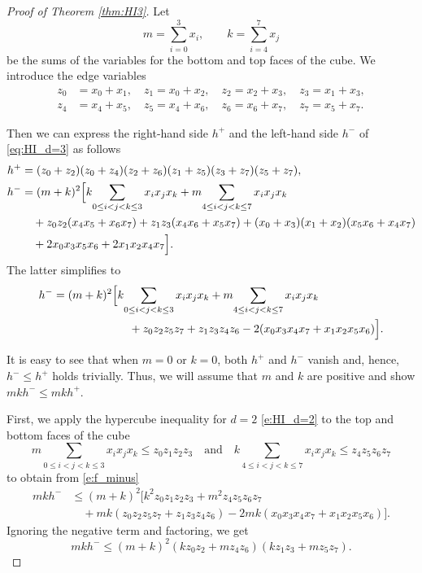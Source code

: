 \documentclass[11pt]{amsart}
\newcommand{\R}{\mathbb R}
\newtheorem{thm}{Theorem}[section]
\theoremstyle{definition}
\theoremstyle{remark}
\begin{document}

\begin{proof}[Proof of Theorem \ref{thm:HI3}]
Let
\[
m = \sum_{i=0}^3 x_i, \qquad k = \sum_{i=4}^7 x_j
\]
be the sums of the variables for the bottom and top faces of the cube. We introduce the edge variables
\[
\begin{aligned}
z_0 &= x_0 + x_1, \quad z_1 = x_0 + x_2, \quad z_2 = x_2 + x_3, \quad z_3 = x_1 + x_3,\\
z_4 &= x_4 + x_5, \quad z_5 = x_4 + x_6, \quad z_6 = x_6 + x_7, \quad z_7 = x_5 + x_7.
\end{aligned}
\]


Then we can express the right-hand side $h^+$ and the left-hand side $h^-$ of \eqref{eq:HI_d=3} as follows
\begin{align}\label{eq:HI_d=3_simple}
h^+&=(z_0+z_2)(z_0+z_4)(z_2+z_6)(z_1+z_5)(z_3+z_7)(z_5+z_7),\\
h^-&=(m+k)^2 \Big[
k\!\sum_{0 \le i<j<k \le 3} x_i x_j x_k +
m\!\sum_{4 \le i<j<k \le 7} x_i x_j x_k \notag \\
&\quad + z_0z_2(x_4x_5+x_6x_7) \notag + z_1z_3(x_4x_6+x_5x_7) + (x_0+x_3)(x_1+x_2)(x_5x_6+x_4x_7) \notag \\
&\quad + 2x_0x_3x_5x_6 + 2x_1x_2x_4x_7
\Big].\notag 
\end{align}
The latter simplifies to
\begin{align}\label{e:f_minus}
h^-=(m+k)^2 \Big[
&k\!\sum_{0 \le i<j<k \le 3} x_i x_j x_k +
m\!\sum_{4 \le i<j<k \le 7} x_i x_j x_k \notag \\
&\quad + z_0z_2z_5z_7 + z_1z_3z_4z_6- 2(x_0x_3x_4x_7 + x_1x_2x_5x_6)\Big].
\end{align}

It is easy to see that when $m=0$ or $k=0$, both $h^+$ and $h^-$ vanish and, hence, $h^-\leq h^+$ holds trivially. Thus, we will assume that $m$ and $k$ are positive and show $mkh^-\leq mkh^+$.

First, we apply the hypercube inequality for $d=2$ \eqref{e:HI_d=2} to the top and bottom faces of the cube
$$
m\!\sum_{0 \le i<j<k \le 3} x_i x_j x_k \leq z_0z_1z_2z_3\quad\text{and}\quad 
k\!\sum_{4 \le i<j<k \le 7} x_i x_j x_k \leq z_4z_5z_6z_7
$$
to obtain from \eqref{e:f_minus}
\begin{align*}
mkh^-&\leq  (m+k)^2\Big[k^2z_0z_1z_2z_3+m^2z_4z_5z_6z_7\\ 
&\quad +mk(z_0z_2z_5z_7 + z_1z_3z_4z_6)- 2mk(x_0x_3x_4x_7 + x_1x_2x_5x_6)\Big]. 
\end{align*}
Ignoring the negative term and factoring, we get
\begin{equation}\label{e:mkf_minus}
 mkh^-\leq (m+k)^2(kz_0z_2 + mz_4z_6)(kz_1z_3 + mz_5z_7).
\end{equation}



\end{proof}
\end{document}
